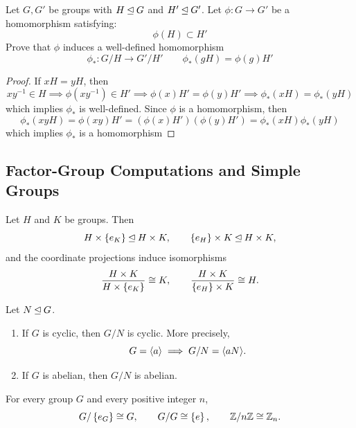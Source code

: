 \documentclass[12pt,a4paper]{article}
\begin{document}
    \begin{ex}
        Let $G,G'$ be groups with $H\unlhd G$ and $H'\unlhd G'$. Let $\phi:G\to G'$ be a homomorphism satisfying:
        \[
            \phi(H)\subset H'
        \]
        Prove that $\phi$ induces a well-defined homomorphism
        \[
            \phi_*:G/H\to G'/H'\qquad\phi_*(gH)=\phi(g)H'
        \]
    \end{ex}
    \begin{proof}
        If $xH=yH$, then
        \[
            xy^{-1}\in H\implies \phi(xy^{-1})\in H'\implies \phi(x)H'=\phi(y)H'\implies \phi_*(xH)=\phi_*(yH)
        \]
        which implies $\phi_*$ is well-defined. Since $\phi$ is a homomorphism, then
        \[
            \phi_*(xyH)=\phi(xy)H'=(\phi(x)H')(\phi(y)H')=\phi_*(xH)\phi_*(yH)
        \]
        which implies $\phi_*$ is a homomorphism
    \end{proof}
    
    
    \subsection{Factor-Group Computations and Simple Groups}
    
    \begin{thm}
        Let $H$ and $K$ be groups. Then
        \[
            H \times \left\{ e_K \right\} \unlhd H \times K,
            \qquad
            \left\{ e_H \right\} \times K \unlhd H \times K,
        \]
        and the coordinate projections induce isomorphisms
        \[
            \frac{H \times K}{H \times \left\{ e_K \right\}} \cong K,
            \qquad
            \frac{H \times K}{\left\{ e_H \right\} \times K} \cong H.
        \]
    \end{thm}
    \bigskip
    
    \begin{thm}
        Let $N \unlhd G$.
        \begin{enumerate}
            \item If $G$ is cyclic, then $G/N$ is cyclic. More precisely,
            \[
                G = \langle a \rangle
                \implies G/N = \langle aN \rangle.
            \]
            \item If $G$ is abelian, then $G/N$ is abelian.
        \end{enumerate}
    \end{thm}
    \bigskip
    
    \begin{eg}
        For every group $G$ and every positive integer $n$,
        \[
            G/\left\{ e_G \right\} \cong G,
            \qquad
            G/G \cong \left\{ e \right\},
            \qquad
            \mathbb{Z}/n\mathbb{Z} \cong \mathbb{Z}_n.
        \]
    \end{eg}
    \bigskip
    
\end{document}
